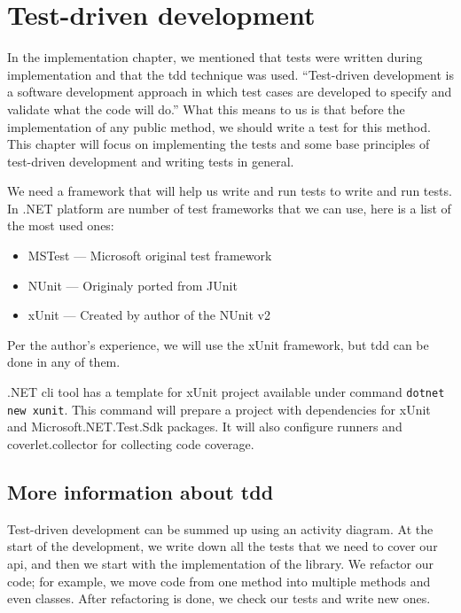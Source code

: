 \chapter {Test-driven development}

In the implementation chapter, we mentioned that tests were written during implementation and that the \acrshort{tdd} technique was used.
``Test-driven development is a software development approach in which test cases are developed to specify and validate what the code will do.'' \cite{hamilton_what_2020}
What this means to us is that before the implementation of any public method, we should write a test for this method.
This chapter will focus on implementing the tests and some base principles of test-driven development and writing tests in general.

We need a framework that will help us write and run tests to write and run tests.
In .NET platform are number of test frameworks that we can use, here is a list of the most used ones:

\begin{itemize}
	\item {MSTest --- Microsoft original test framework}
	\item {NUnit --- Originaly ported from JUnit \cite{poole_nunitorg_nodate}}
	\item {xUnit --- Created by author of the NUnit v2 \cite{net_foundation_home_nodate}}
\end{itemize}

Per the author's experience, we will use the xUnit framework, but \acrshort{tdd} can be done in any of them.

.NET \acrshort{cli} tool has a template for xUnit project available under command \texttt{dotnet new xunit}. This command will
prepare a project with dependencies for xUnit and Microsoft.NET.Test.Sdk packages. It will also configure runners and coverlet.collector for collecting
code coverage.

\section{More information about \acrshort{tdd}}

Test-driven development can be summed up using an activity diagram.
At the start of the development, we write down all the tests that we need to cover our \acrshort{api}, and then we start with the implementation of the library.
We refactor our code; for example, we move code from one method into multiple methods and even classes.
After refactoring is done, we check our tests and write new ones.

